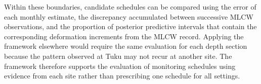 Within these boundaries, candidate schedules can be compared using the error of each monthly estimate, the discrepancy accumulated between successive MLCW observations, and the proportion of posterior predictive intervals that contain the corresponding deformation increments from the MLCW record. Applying the framework elsewhere would require the same evaluation for each depth section because the pattern observed at Tuku may not recur at another site. The framework therefore supports the evaluation of monitoring schedules using evidence from each site rather than prescribing one schedule for all settings.

\FloatBarrier
